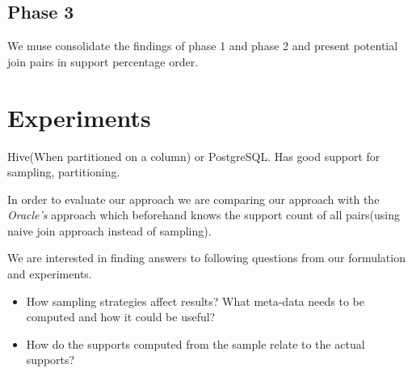 \documentclass{article}
\begin{document}
\subsection{Phase 3}
We muse consolidate the findings of phase 1 and phase 2 and present potential join pairs in support percentage order.
\section{Experiments}

Hive(When partitioned on a column) or PostgreSQL. Has good support for sampling, partitioning. 

In order to evaluate our approach we are comparing our approach with the \textit{Oracle's} approach which beforehand knows the support count of all pairs(using naive join approach instead of sampling). 

We are interested in finding answers to following questions from our formulation and experiments.

\begin{itemize}

\item How sampling strategies affect results? What meta-data needs to be computed and how it could be useful?

\item How do the supports computed from the sample relate to the actual supports?

\end{itemize}
\end{document}
